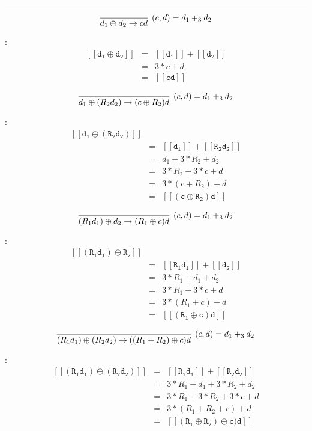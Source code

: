 \documentclass[a4paper,10pt]{article}
\newcommand{\denot}[1]{\mathtt{[[{#1}]]}}
\begin{document}
\begin{enumerate}
\hrule

\[
\infer[(c, d) = d_{1} +_3 d_{2}] 
  {d_{1} \oplus d_{2} \rightarrow cd}
  {}  
\]

\proof:
\begin{eqnarray*}
\denot{d_{1} \oplus d_{2}}  
            & = & \denot{d_{1}} + \denot{d_{2}} \\
            & = & 3 * c + d  \\            
            & = & \denot{cd} 
\end{eqnarray*}

\[
\infer[(c, d) = d_{1} +_3 d_{2}] 
  {d_{1} \oplus (R_{2} d_{2}) \rightarrow (c \oplus R_{2}) d}
  {}  
\]

\proof:
\begin{eqnarray*}
\denot{d_{1} \oplus (R_{2} d_{2})}  \\
            & = & \denot{d_{1}} + \denot{R_{2} d_{2}} \\
            & = & d_{1} + 3 * R_{2} + d_{2} \\
            & = & 3 * R_{2} +  3 * c + d \\
            & = & 3 * (c + R_{2}) + d \\
            & = & \denot{(c \oplus R_{2}) d}       
\end{eqnarray*}

\[
\infer[(c, d) = d_{1} +_3 d_{2}] 
  {(R_{1} d_{1}) \oplus d_{2}  \rightarrow (R_{1} \oplus c) d} 
  {}  
\]

\proof:
\begin{eqnarray*}
\denot{(R_{1} d_{1}) \oplus R_{2}}  \\
            & = & \denot{R_{1} d_{1}} + \denot{d_{2}} \\
            & = & 3 * R_{1} + d_{1} + d_{2} \\
            & = & 3 * R_{1} +  3 * c + d \\
            & = & 3 * (R_{1} + c) + d \\
            & = & \denot{(R_{1} \oplus c) d}    
\end{eqnarray*}

\[
\infer[(c, d) = d_{1} +_3 d_{2}] 
  {(R_{1} d_{1}) \oplus (R_{2} d_{2}) \rightarrow ((R_{1} + R_{2}) \oplus c) d}
  {}  
\]

\proof:
\begin{eqnarray*}
\denot{(R_{1} d_{1}) \oplus (R_{2} d_{2})}  
            & = & \denot{R_{1} d_{1}} + \denot{R_{2} d_{2}} \\
            & = & 3 * R_{1} + d_{1} + 3 * R_{2} + d_{2} \\
            & = & 3 * R_{1} +  3 * R_{2} + 3 * c + d \\
            & = & 3 * (R_{1} + R_{2} + c) + d \\
            & = & \denot{(R_{1} \oplus R_{2}) \oplus c) d}       
\end{eqnarray*}


\end{enumerate}
\end{document}

